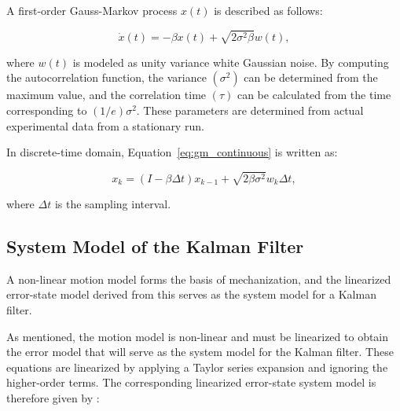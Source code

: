 \documentclass[conference]{IEEEtran}
\begin{document}
A first-order Gauss-Markov process $x(t)$ is described as follows:

\begin{equation}
    \dot{x}(t) = -\beta x(t) + \sqrt{2\sigma^2 \beta} w(t),
    \label{eq:gm_continuous}
\end{equation}

where $w(t)$ is modeled as unity variance white Gaussian noise. By computing the autocorrelation function, the variance $(\sigma^2)$ can be determined from the maximum value, and the correlation time $(\tau)$ can be calculated from the time corresponding to $(1/e)\sigma^2$. These parameters are determined from actual experimental data from a stationary run.

In discrete-time domain, Equation~\eqref{eq:gm_continuous} is written as:

\begin{equation}
    x_k = (I - \beta \Delta t) x_{k-1} + \sqrt{2\beta \sigma^2} w_k \Delta t,
\end{equation}

where $\Delta t$ is the sampling interval.

\subsection{System Model of the Kalman Filter}

A non-linear motion model forms the basis of mechanization, and the linearized error-state model derived from this serves as the system model for a Kalman filter.

As mentioned, the motion model is non-linear and must be linearized to obtain the error model that will serve as the system model for the Kalman filter. These equations are linearized by applying a Taylor series expansion and ignoring the higher-order terms. The corresponding linearized error-state system model is therefore given by \cite{noureldin2013}:
\end{document}
